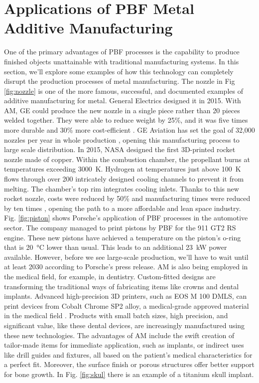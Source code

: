 
\section{Applications of PBF Metal Additive Manufacturing}
\label{sec:examplesPBF}
One of the primary advantages of PBF processes is the capability to produce finished objects unattainable with traditional manufacturing systems. In this section, we'll explore some examples of how this technology can completely disrupt the production processes of metal manufacturing. The nozzle in Fig \ref{fig:nozzle} is one of the more famous, successful, and documented examples of additive manufacturing for metal. General Electrics designed it in 2015. With AM, GE could produce the new nozzle in a single piece rather than 20 pieces welded together. They were able to reduce weight by 25\%, and it was five times more durable and 30\% more cost-efficient \cite{amy_kover_transformation_2018}. GE Aviation has set the goal of 32,000 nozzles per year in whole production \cite{milewski_additive_2017}, opening this manufacturing process to large scale distribution. In 2015, NASA designed the first 3D-printed rocket nozzle made of copper. Within the combustion chamber, the propellant burns at temperatures exceeding \SI{3000}{\kelvin}. Hydrogen at temperatures just above \SI{100}{\kelvin} flows through over 200 intricately designed cooling channels to prevent it from melting. The chamber's top rim integrates cooling inlets. Thanks to this new rocket nozzle, costs were reduced by 50\% and manufacturing times were reduced by ten times \cite{tracy_mcmahan_nasa_2015}, opening the path to a more affordable and lean space industry. Fig. \ref{fig:piston} shows Porsche's application of PBF processes in the automotive sector. The company managed to print pistons by PBF for the 911 GT2 RS engine. These new pistons have achieved a temperature on the piston's o-ring that is \SI{20}{\degreeCelsius} lower than usual. This leads to an additional \SI{23}{\kilo\watt} power available. However, before we see large-scale production, we'll have to wait until at least 2030 \cite{roberto_baldwin_porsches_2020} according to Porsche's press release. AM is also being employed in the medical field, for example, in dentistry. Custom-fitted designs are transforming the traditional ways of fabricating items like crowns and dental implants. Advanced high-precision 3D printers, such as EOS M 100 DMLS, can print devices from Cobalt Chrome SP2 alloy, a medical-grade approved material in the medical field \cite{milewski_additive_2017}. Products with small batch sizes, high precision, and significant value, like these dental devices, are increasingly manufactured using these new technologies. The advantages of AM include the swift creation of tailor-made items for immediate application, such as implants, or indirect uses like drill guides and fixtures, all based on the patient's medical characteristics for a perfect fit. Moreover, the surface finish or porous structures offer better support for bone growth. In Fig. \ref{fig:skul} there is an example of a titanium skull implant.
